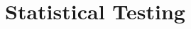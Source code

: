 \section{Statistical Testing}
\label{Statistical Testing}






































 



